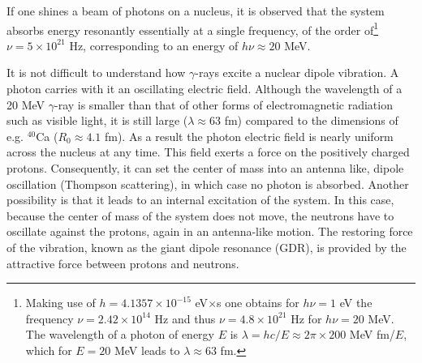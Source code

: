 If one shines a beam of photons on a nucleus, it is observed that the system 
absorbs energy resonantly essentially at a single frequency, of the order of\footnote{Making use of $h=4.1357\times10^{-15}$ eV$\times$s one obtains for $h\nu=1$ eV the frequency $\nu=2.42\times10^{14}$ Hz and thus $\nu=4.8\times10^{21}$ Hz for $h\nu=20$ MeV. The wavelength of a photon of energy $E$ is $\lambda=hc/E\approx2\pi\times200$ MeV fm/$E$, which for $E=20$ MeV leads to $\lambda\approx63$ fm.} $\nu=5\times10^{21}$ Hz, corresponding to an energy of $h\nu\approx20$ MeV.

It is not difficult to understand how $\gamma$-rays excite a nuclear dipole vibration. A photon carries with it an oscillating electric field. Although the wavelength of a 20 MeV $\gamma$-ray is smaller than that of other forms of electromagnetic radiation such as visible light, it is still large ($\lambda\approx63$ fm) compared to the dimensions of e.g. $^{40}$Ca ($R_0\approx4.1$ fm). As a result the photon electric field is nearly uniform across the nucleus at any time. This field exerts a force on the positively charged protons. Consequently, it can set the center of mass into an antenna like, dipole oscillation (Thompson scattering), in which case no photon is absorbed. Another possibility is that it leads to an internal excitation of the system. In this case, because the center of mass of the system does not move, the neutrons have to oscillate against the protons, again in an antenna-like motion. The restoring force of the vibration, known as the giant dipole resonance (GDR), is provided by the attractive force between protons and neutrons.

